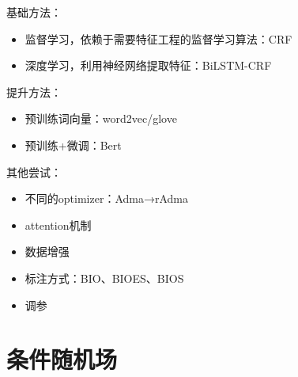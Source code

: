 \documentclass[9pt,aspectratio=169]{ctexbeamer}
\begin{document}
	\begin{frame}
		基础方法：
		\begin{itemize}
			\item 监督学习，依赖于需要特征工程的监督学习算法：CRF
			\item 深度学习，利用神经网络提取特征：BiLSTM-CRF
		\end{itemize}
		提升方法：
		\begin{itemize}
			\item 预训练词向量：word2vec/glove
			\item 预训练+微调：Bert
		\end{itemize}
		其他尝试：
		\begin{itemize}
			\item 不同的optimizer：Adma→rAdma
			\item attention机制
			\item 数据增强
			\item 标注方式：BIO、BIOES、BIOS
			\item 调参
		\end{itemize}
		
		
		
		
		
	\end{frame}
	
	\section{条件随机场}
\end{document}
